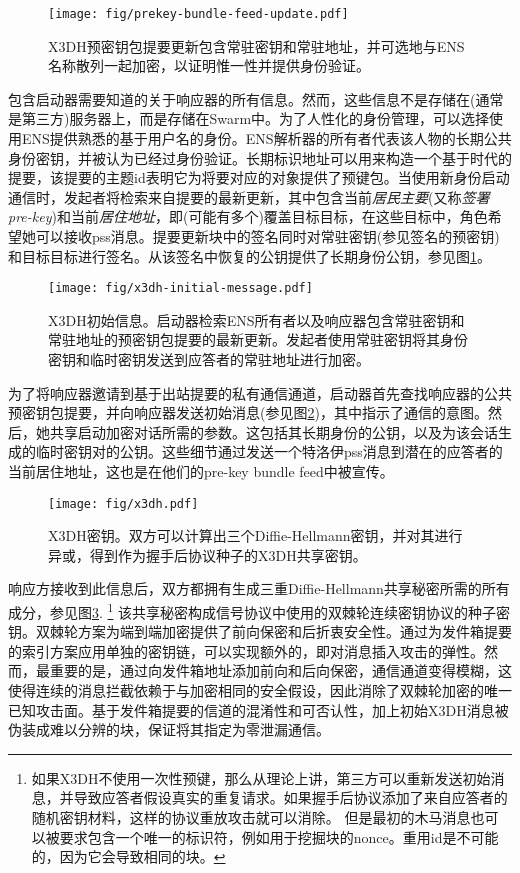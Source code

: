 \begin{figure}[htbp]
   \centering
   \texttt{[image: fig/prekey-bundle-feed-update.pdf]}
   \caption[X3DH预密钥包feed更新\statusgreen]{X3DH预密钥包提要更新包含常驻密钥和常驻地址，并可选地与ENS名称散列一起加密，以证明惟一性并提供身份验证。}
\label{fig:prekey-bundle-feed-update}
\end{figure}


包含启动器需要知道的关于响应器的所有信息。然而，这些信息不是存储在(通常是第三方)服务器上，而是存储在Swarm中。为了人性化的身份管理，可以选择使用ENS提供熟悉的基于用户名的身份。ENS解析器的所有者代表该人物的长期公共身份密钥，并被认为已经过身份验证。长期标识地址可以用来构造一个基于时代的提要，该提要的主题id表明它为将要对应的对象提供了预键包。当使用新身份启动通信时，发起者将检索来自提要的最新更新，其中包含当前\emph{居民主要}(又称\emph{签署pre-key})和当前\emph{居住地址}，即(可能有多个)覆盖目标目标，在这些目标中，角色希望她可以接收pss消息。提要更新块中的签名同时对常驻密钥(参见签名的预密钥)和目标目标进行签名。从该签名中恢复的公钥提供了长期身份公钥，参见图\ref{fig:prekey-bundle-feed-update}。


\begin{figure}[htbp]
   \centering
   \texttt{[image: fig/x3dh-initial-message.pdf]}
   \caption[X3DH初始消息]{X3DH初始信息。启动器检索ENS所有者以及响应器包含常驻密钥和常驻地址的预密钥包提要的最新更新。发起者使用常驻密钥将其身份密钥和临时密钥发送到应答者的常驻地址进行加密。 }
\label{fig:x3dh-initial-message}
\end{figure}


为了将响应器邀请到基于出站提要的私有通信通道，启动器首先查找响应器的公共预密钥包提要，并向响应器发送初始消息(参见图\ref{fig:x3dh-initial-message})，其中指示了通信的意图。然后，她共享启动加密对话所需的参数。这包括其长期身份的公钥，以及为该会话生成的临时密钥对的公钥。这些细节通过发送一个特洛伊pss消息到潜在的应答者的当前居住地址，这也是在他们的pre-key bundle feed中被宣传。 

\begin{figure}[htbp]
   \centering
   \texttt{[image: fig/x3dh.pdf]}
   \caption[X3DH密钥\statusgreen]{X3DH密钥。双方可以计算出三个Diffie-Hellmann密钥，并对其进行异或，得到作为握手后协议种子的X3DH共享密钥。}
   \label{fig:x3dh}
\end{figure}

响应方接收到此信息后，双方都拥有生成三重Diffie-Hellmann共享秘密所需的所有成分，参见图\ref{fig:x3dh}.%
%
\footnote{如果X3DH不使用一次性预键，那么从理论上讲，第三方可以重新发送初始消息，并导致应答者假设真实的重复请求。如果握手后协议添加了来自应答者的随机密钥材料，这样的协议重放攻击就可以消除。
但是最初的木马消息也可以被要求包含一个唯一的标识符，例如用于挖掘块的nonce。重用id是不可能的，因为它会导致相同的块。}
%
该共享秘密构成信号协议中使用的双棘轮连续密钥协议的种子密钥。双棘轮方案为端到端加密提供了前向保密和后折衷安全性。通过为发件箱提要的索引方案应用单独的密钥链，可以实现额外的，即对消息插入攻击的弹性。然而，最重要的是，通过向发件箱地址添加前向和后向保密，通信通道变得模糊，这使得连续的消息拦截依赖于与加密相同的安全假设，因此消除了双棘轮加密的唯一已知攻击面。基于发件箱提要的信道的混淆性和可否认性，加上初始X3DH消息被伪装成难以分辨的块，保证将其指定为零泄漏通信。

